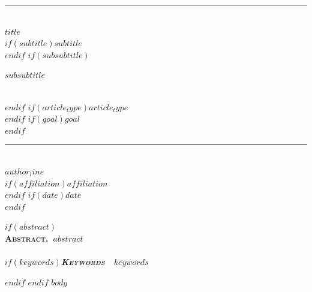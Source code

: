 \documentclass[$if(fontsize)$$fontsize$$else$10pt$endif$]{article}
\begin{document}
\begin{center}
{\color{accent}\rule{0.6\textwidth}{0.8pt}}\\[10pt]
{\bfseries\scshape\fontsize{19}{23}\selectfont $title$}\\[7pt]
$if(subtitle)${\itshape\large $subtitle$}\\[6pt]$endif$
$if(subsubtitle)$\parbox{0.86\textwidth}{\centering\small\itshape\color{faint} $subsubtitle$}\\[8pt]$endif$
$if(article_type)${\footnotesize\color{accent}\scshape\bfseries $article_type$}\\[3pt]$endif$
$if(goal)${\itshape\color{deep}\small $goal$}\\[9pt]$endif$
{\color{accent}\rule{0.6\textwidth}{0.8pt}}\\[10pt]
{\scshape $author_line$}\\[2pt]
$if(affiliation)${\itshape\color{faint}\small $affiliation$}\\[2pt]$endif$
$if(date)${\itshape\color{faint}\small $date$}\\[12pt]$endif$
\end{center}
$if(abstract)$
\noindent{\color{accent}\rule{\textwidth}{0.6pt}}\\[2pt]
{\small\noindent\textbf{\scshape\color{deep}Abstract.\ }$abstract$}\\[-2pt]
\noindent{\color{accent}\rule{\textwidth}{0.6pt}}\\[1pt]
$if(keywords)${\itshape\footnotesize\color{faint}\noindent\textbf{\upshape\scshape\color{deep}Keywords\ }\ $keywords$}\par\vspace{8pt}$endif$
$endif$
\thispagestyle{fancy}
$body$
\end{document}

